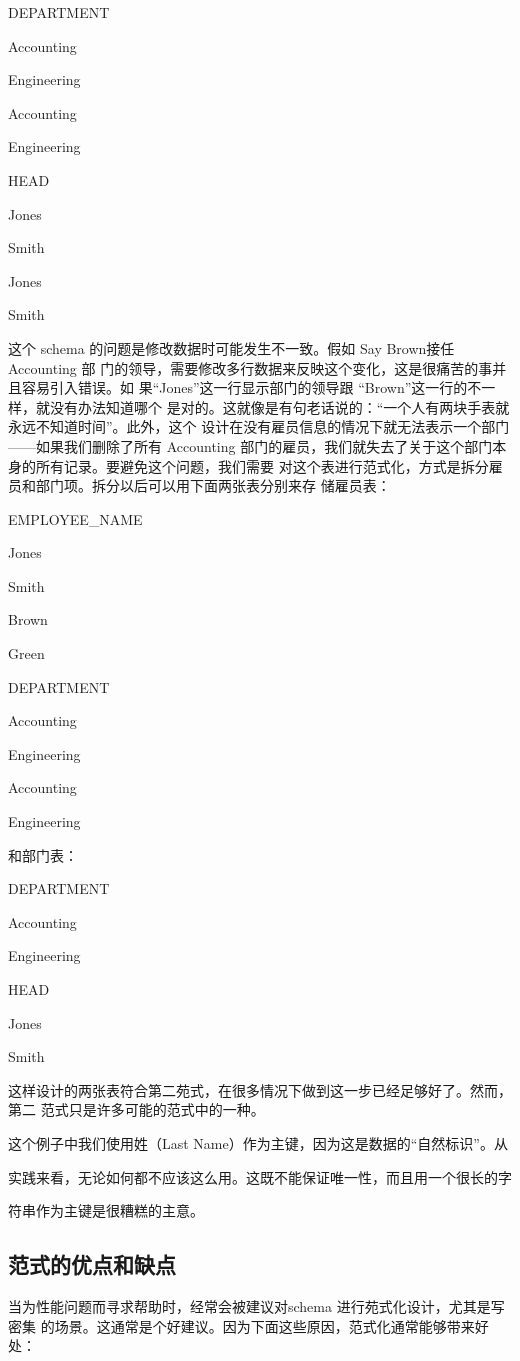 DEPARTMENT

Accounting

Engineering

Accounting

Engineering

HEAD

Jones

Smith

Jones

Smith

这个 schema 的问题是修改数据时可能发生不一致。假如 Say Brown接任 Accounting 部
门的领导，需要修改多行数据来反映这个变化，这是很痛苦的事并且容易引入错误。如
果“Jones”这一行显示部门的领导跟 “Brown”这一行的不一样，就没有办法知道哪个
是对的。这就像是有句老话说的：“一个人有两块手表就永远不知道时间”。此外，这个
设计在没有雇员信息的情况下就无法表示一个部门——如果我们删除了所有 Accounting
部门的雇员，我们就失去了关于这个部门本身的所有记录。要避免这个问题，我们需要
对这个表进行范式化，方式是拆分雇员和部门项。拆分以后可以用下面两张表分别来存
储雇员表：

EMPLOYEE\_NAME

Jones

Smith

Brown

Green

DEPARTMENT

Accounting

Engineering

Accounting

Engineering

和部门表：

DEPARTMENT

Accounting

Engineering

HEAD

Jones

Smith

这样设计的两张表符合第二苑式，在很多情况下做到这一步已经足够好了。然而，第二
范式只是许多可能的范式中的一种。

这个例子中我们使用姓（Last Name）作为主键，因为这是数据的“自然标识”。从

实践来看，无论如何都不应该这么用。这既不能保证唯一性，而且用一个很长的字

符串作为主键是很糟糕的主意。

\subsection{范式的优点和缺点}
当为性能问题而寻求帮助时，经常会被建议对schema 进行苑式化设计，尤其是写密集
的场景。这通常是个好建议。因为下面这些原因，范式化通常能够带来好处：

